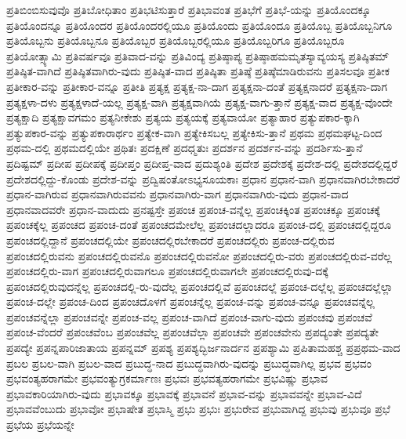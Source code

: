 {ಪ್ರತಿಬಿಂಬಿಸುವುವೊ
ಪ್ರತಿಬೋಧಿತಾಂ
ಪ್ರತಿಭಟಿಸುತ್ತಾರೆ
ಪ್ರತಿಭಾವಂತ
ಪ್ರತಿಭೆಗೆ
ಪ್ರತಿಭೆ-ಯನ್ನು
ಪ್ರತಿಯೊಂದಕ್ಕೂ
ಪ್ರತಿಯೊಂದನ್ನೂ
ಪ್ರತಿಯೊಂದರ
ಪ್ರತಿಯೊಂದರಲ್ಲಿಯೂ
ಪ್ರತಿಯೊಂದು
ಪ್ರತಿಯೊಂದೂ
ಪ್ರತಿಯೊಬ್ಬ
ಪ್ರತಿಯೊಬ್ಬನಿಗೂ
ಪ್ರತಿಯೊಬ್ಬನು
ಪ್ರತಿಯೊಬ್ಬನೂ
ಪ್ರತಿಯೊಬ್ಬರ
ಪ್ರತಿಯೊಬ್ಬರಲ್ಲಿಯೂ
ಪ್ರತಿಯೊಬ್ಬರಿಗೂ
ಪ್ರತಿಯೊಬ್ಬರೂ
ಪ್ರತಿಯೋತ್ಸ್ಯಾಮಿ
ಪ್ರತಿವರ್ಷವೂ
ಪ್ರತಿವಾದ-ವನ್ನು
ಪ್ರತಿವಿಂದ್ಯ
ಪ್ರತಿಷ್ಠಾಪ್ಯ
ಪ್ರತಿಷ್ಠಾಹಮಮೃತಸ್ಯಾವ್ಯಯಸ್ಯ
ಪ್ರತಿಷ್ಠಿತಮ್
ಪ್ರತಿಷ್ಠಿತ-ವಾಗಿದೆ
ಪ್ರತಿಷ್ಠಿತವಾಗಿರು-ವುದು
ಪ್ರತಿಷ್ಠಿತ-ವಾದ
ಪ್ರತಿಷ್ಠಿತಾ
ಪ್ರತಿಷ್ಠೆ
ಪ್ರತಿಷ್ಠೆಮಾಡಿರುವನು
ಪ್ರತಿಸಲವೂ
ಪ್ರತೀಕ
ಪ್ರತೀಕಾರ-ವನ್ನು
ಪ್ರತೀಕಾರ-ವನ್ನೂ
ಪ್ರತೀತಿ
ಪ್ರತ್ಯಕ್ಷ
ಪ್ರತ್ಯಕ್ಷ-ನಾ-ದಾಗ
ಪ್ರತ್ಯಕ್ಷನಾ-ದಂತೆ
ಪ್ರತ್ಯಕ್ಷನಾದರೆ
ಪ್ರತ್ಯಕ್ಷನಾ-ದಾಗ
ಪ್ರತ್ಯಕ್ಷಳಾ-ದಳು
ಪ್ರತ್ಯಕ್ಷಳಾದೆ-ಯಲ್ಲ
ಪ್ರತ್ಯಕ್ಷ-ವಾಗಿ
ಪ್ರತ್ಯಕ್ಷವಾಗಿಯೆ
ಪ್ರತ್ಯಕ್ಷ-ವಾಗು-ತ್ತಾನೆ
ಪ್ರತ್ಯಕ್ಷ-ವಾದ
ಪ್ರತ್ಯಕ್ಷ-ವೊಂದೇ
ಪ್ರತ್ಯಕ್ಷಾದಿ
ಪ್ರತ್ಯಕ್ಷಾವಗಮಂ
ಪ್ರತ್ಯನೀಕೇಶು
ಪ್ರತ್ಯಯ
ಪ್ರತ್ಯಯಕ್ಕೆ
ಪ್ರತ್ಯವಾಯೋ
ಪ್ರತ್ಯಾಹಾರ
ಪ್ರತ್ಯುಪಕಾರ-ಕ್ಕಾಗಿ
ಪ್ರತ್ಯುಪಕಾರ-ವನ್ನು
ಪ್ರತ್ಯುಪಕಾರಾರ್ಥಂ
ಪ್ರತ್ಯೇಕ-ವಾಗಿ
ಪ್ರತ್ಯೇಕಿಸಬಲ್ಲ
ಪ್ರತ್ಯೇಕಿಸು-ತ್ತಾನೆ
ಪ್ರಥಮ
ಪ್ರಥಮಘಟ್ಟ-ದಿಂದ
ಪ್ರಥಮ-ದಲ್ಲಿ
ಪ್ರಥಮದಲ್ಲಿಯೇ
ಪ್ರಥಿತಃ
ಪ್ರದಕ್ಷಿಣೆ
ಪ್ರದಧ್ಮತುಃ
ಪ್ರದರ್ಶನ
ಪ್ರದರ್ಶನ-ವನ್ನು
ಪ್ರದರ್ಶಿಸು-ತ್ತಾನೆ
ಪ್ರದಿಷ್ಟಮ್
ಪ್ರದೀಪ
ಪ್ರದೀಪಕ್ಕೆ
ಪ್ರದೀಪ್ತಂ
ಪ್ರದೀಪ್ತ-ವಾದ
ಪ್ರದುಶ್ಯಂತಿ
ಪ್ರದೇಶ
ಪ್ರದೇಶಕ್ಕೆ
ಪ್ರದೇಶ-ದಲ್ಲಿ
ಪ್ರದೇಶದಲ್ಲಿದ್ದರೆ
ಪ್ರದೇಶದಲ್ಲಿದ್ದು-ಕೊಂಡು
ಪ್ರದೇಶ-ವನ್ನು
ಪ್ರದ್ವಿಷಂತೋಽಭ್ಯಸೂಯಕಾಃ
ಪ್ರಧಾನ
ಪ್ರಧಾನ-ವಾಗಿ
ಪ್ರಧಾನವಾಗಿರಬೇಕಾದರೆ
ಪ್ರಧಾನ-ವಾಗಿರುವ
ಪ್ರಧಾನವಾಗಿರುವವನು
ಪ್ರಧಾನವಾಗಿರು-ವಾಗ
ಪ್ರಧಾನವಾಗಿರು-ವುದು
ಪ್ರಧಾನ-ವಾದ
ಪ್ರಧಾನವಾದವರೇ
ಪ್ರಧಾನ-ವಾದುದು
ಪ್ರನಷ್ಟಸ್ತೇ
ಪ್ರಪಂಚ
ಪ್ರಪಂಚ-ವನ್ನೆಲ್ಲ
ಪ್ರಪಂಚಕ್ಕಿಂತ
ಪ್ರಪಂಚಕ್ಕೂ
ಪ್ರಪಂಚಕ್ಕೆ
ಪ್ರಪಂಚಕ್ಕೆಲ್ಲ
ಪ್ರಪಂಚದ
ಪ್ರಪಂಚ-ದಂತೆ
ಪ್ರಪಂಚದಮೇಲೆಲ್ಲ
ಪ್ರಪಂಚದಲ್ಲಾದರೂ
ಪ್ರಪಂಚ-ದಲ್ಲಿ
ಪ್ರಪಂಚದಲ್ಲಿದ್ದರೂ
ಪ್ರಪಂಚದಲ್ಲಿದ್ದಾನೆ
ಪ್ರಪಂಚದಲ್ಲಿಯೇ
ಪ್ರಪಂಚದಲ್ಲಿರಬೇಕಾದರೆ
ಪ್ರಪಂಚದಲ್ಲಿರು
ಪ್ರಪಂಚ-ದಲ್ಲಿರುವ
ಪ್ರಪಂಚದಲ್ಲಿರುವನು
ಪ್ರಪಂಚದಲ್ಲಿರುವನೊ
ಪ್ರಪಂಚದಲ್ಲಿರುವನೋ
ಪ್ರಪಂಚದಲ್ಲಿರು-ವರು
ಪ್ರಪಂಚದಲ್ಲಿರುವ-ವರೆಲ್ಲ
ಪ್ರಪಂಚದಲ್ಲಿರು-ವಾಗ
ಪ್ರಪಂಚದಲ್ಲಿರುವಾಗಲೂ
ಪ್ರಪಂಚದಲ್ಲಿರುವಾಗಲೇ
ಪ್ರಪಂಚದಲ್ಲಿರುವು-ದಕ್ಕೆ
ಪ್ರಪಂಚದಲ್ಲಿರುವುದನ್ನೆಲ್ಲ
ಪ್ರಪಂಚದಲ್ಲಿ-ರು-ವುದೆಲ್ಲ
ಪ್ರಪಂಚದಲ್ಲಿವೆ
ಪ್ರಪಂಚದಲ್ಲೆ
ಪ್ರಪಂಚ-ದಲ್ಲೆಲ್ಲ
ಪ್ರಪಂಚದಲ್ಲೆಲ್ಲಾ
ಪ್ರಪಂಚ-ದಲ್ಲೇ
ಪ್ರಪಂಚ-ದಿಂದ
ಪ್ರಪಂಚದೊಳಗೆ
ಪ್ರಪಂಚನ್ನೆಲ್ಲ
ಪ್ರಪಂಚ-ವನ್ನು
ಪ್ರಪಂಚ-ವನ್ನೂ
ಪ್ರಪಂಚವನ್ನೆಲ್ಲ
ಪ್ರಪಂಚವನ್ನೆಲ್ಲಾ
ಪ್ರಪಂಚವನ್ನೇ
ಪ್ರಪಂಚ-ವಲ್ಲ
ಪ್ರಪಂಚ-ವಾಗಿದೆ
ಪ್ರಪಂಚ-ವಾಗು-ವುದು
ಪ್ರಪಂಚವು
ಪ್ರಪಂಚವೆ
ಪ್ರಪಂಚ-ವೆಂದರೆ
ಪ್ರಪಂಚವೆಂಬ
ಪ್ರಪಂಚವೆಲ್ಲ
ಪ್ರಪಂಚವೆಲ್ಲಾ
ಪ್ರಪಂಚವೇ
ಪ್ರಪಂಚವೇನು
ಪ್ರಪದ್ಯಂತೇ
ಪ್ರಪದ್ಯತೇ
ಪ್ರಪದ್ಯೇ
ಪ್ರಪನ್ನಪಾರಿಜಾತಾಯ
ಪ್ರಪನ್ನಮ್
ಪ್ರಪಶ್ಯ
ಪ್ರಪಶ್ಯದ್ಭಿರ್ಜನಾರ್ದನ
ಪ್ರಪಶ್ಯಾಮಿ
ಪ್ರಪಿತಾಮಹಶ್ಚ
ಪ್ರಪ್ರಥಮ-ವಾದ
ಪ್ರಬಲ
ಪ್ರಬಲ-ವಾಗಿ
ಪ್ರಬಲ-ವಾದ
ಪ್ರಬುದ್ಧ-ನಾದ
ಪ್ರಬುದ್ಧವಾಗಿರು-ವುದನ್ನು
ಪ್ರಬುದ್ಧವಾಗಿಲ್ಲ
ಪ್ರಭವ
ಪ್ರಭವಂ
ಪ್ರಭವಂತ್ಯಹರಾಗಮೇ
ಪ್ರಭವಂತ್ಯುಗ್ರಕರ್ಮಾಣಃ
ಪ್ರಭವಃ
ಪ್ರಭವತ್ಯಹರಾಗಮೇ
ಪ್ರಭವಿಷ್ಣು
ಪ್ರಭಾವ
ಪ್ರಭಾವಕಾರಿಯಾಗಿರು-ವುದು
ಪ್ರಭಾವಕ್ಕೂ
ಪ್ರಭಾವಕ್ಕೆ
ಪ್ರಭಾವನೆ
ಪ್ರಭಾವ-ವನ್ನು
ಪ್ರಭಾವವನ್ನೇ
ಪ್ರಭಾವ-ವಿದೆ
ಪ್ರಭಾವವೆಂಬುದು
ಪ್ರಭಾವೋ
ಪ್ರಭಾಷೇತ
ಪ್ರಭಾಸ್ಮಿ
ಪ್ರಭು
ಪ್ರಭುಃ
ಪ್ರಭುರೇವ
ಪ್ರಭುವಾಗಿದ್ದ
ಪ್ರಭುವು
ಪ್ರಭುವೂ
ಪ್ರಭೆ
ಪ್ರಭೆಯ
ಪ್ರಭೆಯನ್ನೇ
}
